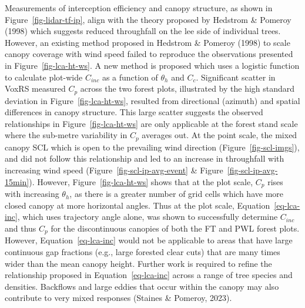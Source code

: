 \documentclass[
  letterpaper,
  DIV=11,
  numbers=noendperiod]{scrartcl}
\begin{document}
Measurements of interception efficiency and canopy structure, as shown
in Figure~\ref{fig-lidar-tf-ip}, align with the theory proposed by
Hedstrom \& Pomeroy (1998) which suggests reduced throughfall on the lee
side of individual trees. However, an existing method proposed in
Hedstrom \& Pomeroy (1998) to scale canopy coverage with wind speed
failed to reproduce the observations presented in
Figure~\ref{fig-lca-ht-ws}. A new method is proposed which uses a
logistic function to calculate plot-wide \(C_{inc}\) as a function of
\(\theta_h\) and \(C_c\). Significant scatter in VoxRS measured \(C_p\)
across the two forest plots, illustrated by the high standard deviation
in Figure~\ref{fig-lca-ht-ws}, resulted from directional (azimuth) and
spatial differences in canopy structure. This large scatter suggests the
observed relationships in Figure~\ref{fig-lca-ht-ws} are only applicable
at the forest stand scale where the sub-metre variability in \(C_p\)
averages out. At the point scale, the mixed canopy SCL which is open to
the prevailing wind direction (Figure~\ref{fig-scl-imgs}), and did not
follow this relationship and led to an increase in throughfall with
increasing wind speed (Figure~\ref{fig-scl-ip-avg-event} \&
Figure~\ref{fig-scl-ip-avg-15min}). However, Figure~\ref{fig-lca-ht-ws}
shows that at the plot scale, \(C_p\) rises with increasing
\(\theta_h\), as there is a greater number of grid cells which have more
closed canopy at more horizontal angles. Thus at the plot scale,
Equation~\ref{eq-lca-inc}, which uses trajectory angle alone, was shown
to successfully determine \(C_{inc}\) and thus \(C_p\) for the
discontinuous canopies of both the FT and PWL forest plots. However,
Equation~\ref{eq-lca-inc} would not be applicable to areas that have
large continuous gap fractions (e.g., large forested clear cuts) that
are many times wider than the mean canopy height. Further work is
required to refine the relationship proposed in
Equation~\ref{eq-lca-inc} across a range of tree species and densities.
Backflows and large eddies that occur within the canopy may also
contribute to very mixed responses (Staines \& Pomeroy, 2023).
\end{document}
